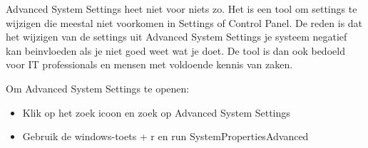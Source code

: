Advanced System Settings heet niet voor niets zo. Het is een tool om settings te wijzigen die meestal niet voorkomen in Settings of Control Panel. De reden is dat het wijzigen van de settings uit Advanced System Settings je systeem negatief kan beinvloeden als je niet goed weet wat je doet. De tool is dan ook bedoeld voor IT professionals en mensen met voldoende kennis van zaken.

Om Advanced System Settings te openen:
\begin{itemize}
\item Klik op het zoek icoon en zoek op Advanced System Settings
\item Gebruik de windows-toets + r en run SystemPropertiesAdvanced
\end{itemize}

\begin{minipage}[t]{\linewidth}
\raggedright
{}
\end{minipage}

